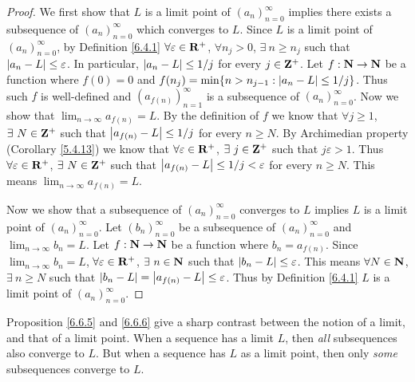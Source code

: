 \begin{proof}
    We first show that \(L\) is a limit point of \((a_n)_{n = 0}^\infty\) implies there exists a subsequence of \((a_n)_{n = 0}^\infty\) which converges to \(L\).
    Since \(L\) is a limit point of \((a_n)_{n = 0}^\infty\), by Definition \ref{6.4.1} \(\forall \varepsilon \in \mathbf{R}^+\), \(\forall n_j > 0\), \(\exists\ n \geq n_j\) such that \(\left\lvert a_n - L\right\rvert \leq \varepsilon\).
    In particular, \(\left\lvert a_n - L\right\rvert \leq 1 / j\) for every \(j \in \mathbf{Z}^+\).
    Let \(f : \mathbf{N} \to \mathbf{N}\) be a function where \(f(0) = 0\) and \(f(n_j) = \min\{n > n_{j - 1} : \left\lvert a_n - L\right\rvert \leq 1 / j\}\).
    Thus such \(f\) is well-defined and \((a_{f(n)})_{n = 1}^\infty\) is a subsequence of \((a_n)_{n = 0}^\infty\).
    Now we show that \(\lim_{n \to \infty} a_{f(n)} = L\).
    By the definition of \(f\) we know that \(\forall j \geq 1\), \(\exists\ N \in \mathbf{Z}^+\) such that \(\left\lvert a_{f(n)} - L\right\rvert \leq 1 / j\) for every \(n \geq N\).
    By Archimedian property (Corollary \ref{5.4.13}) we know that \(\forall \varepsilon \in \mathbf{R}^+\), \(\exists\ j \in \mathbf{Z}^+\) such that \(j \varepsilon > 1\).
    Thus \(\forall \varepsilon \in \mathbf{R}^+\), \(\exists\ N \in \mathbf{Z}^+\) such that \(\left\lvert a_{f(n)} - L\right\rvert \leq 1 / j < \varepsilon\) for every \(n \geq N\).
    This means \(\lim_{n \to \infty} a_{f(n)} = L\).

    Now we show that a subsequence of \((a_n)_{n = 0}^\infty\) converges to \(L\) implies \(L\) is a limit point of \((a_n)_{n = 0}^\infty\).
    Let \((b_n)_{n = 0}^\infty\) be a subsequence of \((a_n)_{n = 0}^\infty\) and \(\lim_{n \to \infty} b_n = L\).
    Let \(f : \mathbf{N} \to \mathbf{N}\) be a function where \(b_n = a_{f(n)}\).
    Since \(\lim_{n \to \infty} b_n = L\), \(\forall \varepsilon \in \mathbf{R}^+\), \(\exists\ n \in \mathbf{N}\) such that \(\left\lvert b_n - L\right\rvert \leq \varepsilon\).
    This means \(\forall N \in \mathbf{N}\), \(\exists\ n \geq N\) such that \(\left\lvert b_n - L\right\rvert = \left\lvert a_{f(n)} - L\right\rvert \leq \varepsilon\).
    Thus by Definition \ref{6.4.1} \(L\) is a limit point of \((a_n)_{n = 0}^\infty\).
\end{proof}

\begin{remark}\label{6.6.7}
    Proposition \ref{6.6.5} and \ref{6.6.6} give a sharp contrast between the notion of a limit, and that of a limit point.
    When a sequence has a limit \(L\), then \emph{all} subsequences also converge to \(L\).
    But when a sequence has \(L\) as a limit point, then only \emph{some} subsequences converge to \(L\).
\end{remark}

